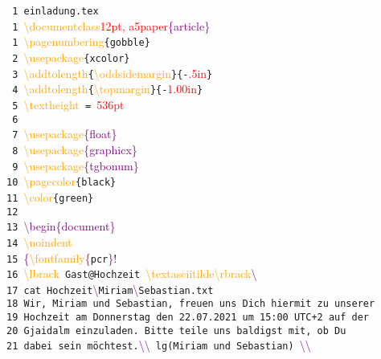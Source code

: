 \documentclass[12pt, a5paper]{article}
\newcommand{\red}[1]{\textcolor{red}{#1}}
\newcommand{\orange}[1]{\textcolor{orange}{#1}}
\newcommand{\purple}[1]{\textcolor{purple}{#1}}
\begin{document}
\noindent
{\selectfont
\verb! 1 einladung.tex!\\
 \verb! 1 !\orange{\textbackslash documentclass}\purple{\lbrack}\red{12pt, a5paper}\purple{\rbrack\{article\}}\\
 \verb! 1 !\orange{\textbackslash pagenumbering}\verb!{gobble}!\\
 \verb! 2 !\orange{\textbackslash usepackage}\verb!{xcolor}!\\
 \verb! 3 !\orange{\textbackslash addtolength}\verb!{!\orange{\textbackslash oddsidemargin}\verb!}{-!\red{.5in}\verb!}!\\
 \verb! 4 !\orange{\textbackslash addtolength}\verb!{!\orange{\textbackslash topmargin}\verb!}{-!\red{1.00in}\verb!}!\\
 \verb! 5 !\orange{\textbackslash textheight}\verb! = !\red{536pt}\\
 \verb! 6 !\\
 \verb! 7 !\orange{\textbackslash usepackage}\purple{\{float\}}\\
 \verb! 8 !\orange{\textbackslash usepackage}\purple{\{graphicx\}}\\
 \verb! 9 !\orange{\textbackslash usepackage}\purple{\{tgbonum\}}\\
 \verb!10 !\orange{\textbackslash pagecolor}\verb!{black}!\\
 \verb!11 !\orange{\textbackslash color}\verb!{green}!\\
 \verb!12 !\\
 \verb!13 !\purple{\textbackslash begin\{document\}}\\
 \verb!14 !\orange{\textbackslash noindent}\\
 \verb!15 !\purple{\{}\orange{\textbackslash fontfamily}\purple{\{}\verb!pcr!\purple{\}}\selectfont!\\
 \verb!16 !\orange{\textbackslash lbrack}\verb! Gast@Hochzeit !\orange{\textbackslash textasciitilde\textbackslash rbrack}\purple{\textbackslash\textdollar}\\
 \verb!17 cat Hochzeit!\purple{\textbackslash\textunderscore}\verb!Miriam!\purple{\textbackslash\textunderscore}\verb!Sebastian.txt!\\
 \verb!18 Wir, Miriam und Sebastian, freuen uns Dich hiermit zu unserer!\\
 \verb!19 Hochzeit am Donnerstag den 22.07.2021 um 15:00 UTC+2 auf der!\\
 \verb!20 Gjaidalm einzuladen. Bitte teile uns baldigst mit, ob Du!\\
 \verb!21 dabei sein möchtest.!\purple{\textbackslash\textbackslash}\verb! lg(Miriam und Sebastian) !\purple{\textbackslash\textbackslash}\\
}
\end{document}
